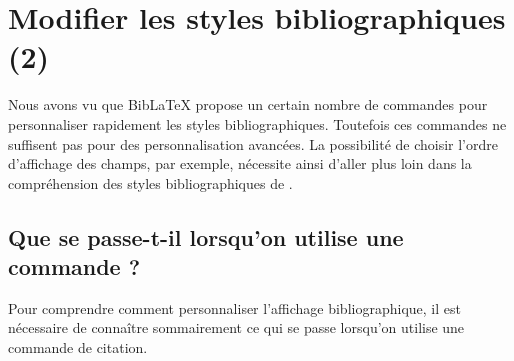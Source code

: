 \chapter{Modifier les styles bibliographiques (2)}\label{style2}


\begin{intro}
    Nous avons vu que BibLaTeX propose un certain nombre de commandes pour personnaliser rapidement les styles bibliographiques. Toutefois  ces commandes ne suffisent pas pour des personnalisation avancées. 
    La possibilité de choisir l'ordre d'affichage des champs, par exemple, nécessite ainsi d'aller plus loin dans la compréhension des styles bibliographiques de .
\end{intro}



\section[Que se passe-t-il lorsqu'on utilise \oldcs{\meta{prefix}cite}]{Que se passe-t-il lorsqu'on utilise une commande  ?}

Pour comprendre comment personnaliser l'affichage bibliographique, il est nécessaire de connaître sommairement ce qui se passe lorsqu'on utilise une commande de citation. 


